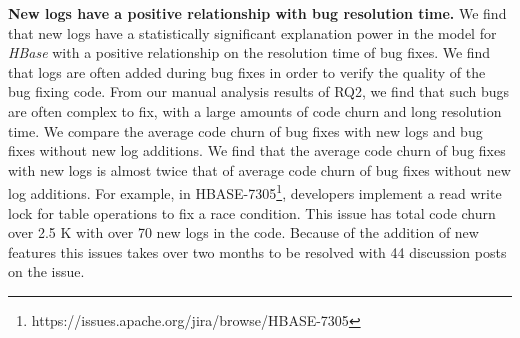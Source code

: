 %	
\textbf{New logs have a positive relationship with bug resolution time.} 
We find that new logs have a statistically significant explanation power in the model for \emph{HBase} with a positive relationship on the resolution time of bug fixes. We find that logs are often added during bug fixes in order to verify the quality of the bug fixing code. From our manual analysis results of RQ2, we find that such bugs are often complex to fix, with a large amounts of code churn and long resolution time. We compare the average code churn of bug fixes with new logs and bug fixes without new log additions. We find that the average code churn of bug fixes with new logs is almost twice that of average code churn of bug fixes without new log additions. For example, in HBASE-7305\footnote{https://issues.apache.org/jira/browse/HBASE-7305}, developers implement a read write lock for table operations to fix a race condition. This issue has total code churn over 2.5 K with over 70 new logs in the code. Because of the addition of new features this issues takes over two months to be resolved with 44 discussion posts on the issue. 



